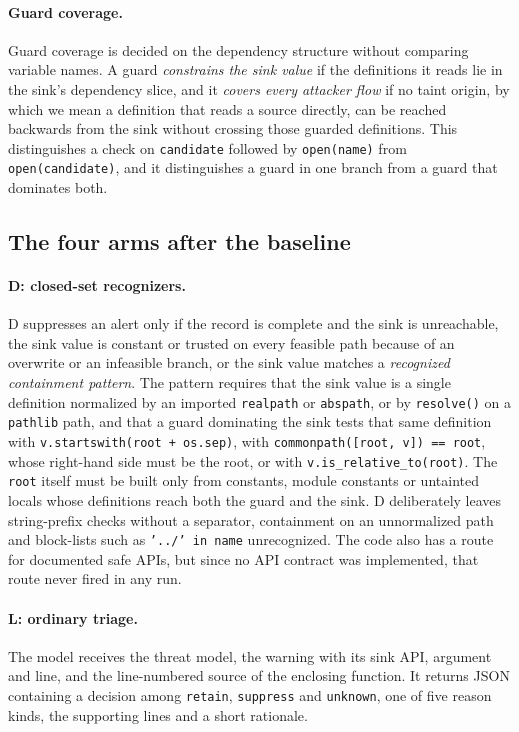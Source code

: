 \paragraph{Guard coverage.}
Guard coverage is decided on the dependency structure without comparing variable names. A guard \emph{constrains the sink value} if the definitions it reads lie in the sink's dependency slice, and it \emph{covers every attacker flow} if no taint origin, by which we mean a definition that reads a source directly, can be reached backwards from the sink without crossing those guarded definitions. This distinguishes a check on \texttt{candidate} followed by \texttt{open(name)} from \texttt{open(candidate)}, and it distinguishes a guard in one branch from a guard that dominates both.

\subsection{The four arms after the baseline}
\paragraph{D: closed-set recognizers.}
D suppresses an alert only if the record is complete and the sink is unreachable, the sink value is constant or trusted on every feasible path because of an overwrite or an infeasible branch, or the sink value matches a \emph{recognized containment pattern}. The pattern requires that the sink value is a single definition normalized by an imported \texttt{realpath} or \texttt{abspath}, or by \texttt{resolve()} on a \texttt{pathlib} path, and that a guard dominating the sink tests that same definition with \texttt{v.startswith(root + os.sep)}, with \texttt{commonpath([root, v]) == root}, whose right-hand side must be the root, or with \texttt{v.is\_relative\_to(root)}. The \texttt{root} itself must be built only from constants, module constants or untainted locals whose definitions reach both the guard and the sink. D deliberately leaves string-prefix checks without a separator, containment on an unnormalized path and block-lists such as \texttt{'../' in name} unrecognized. The code also has a route for documented safe APIs, but since no API contract was implemented, that route never fired in any run.

\paragraph{L: ordinary triage.}
The model receives the threat model, the warning with its sink API, argument and line, and the line-numbered source of the enclosing function. It returns JSON containing a decision among \texttt{retain}, \texttt{suppress} and \texttt{unknown}, one of five reason kinds, the supporting lines and a short rationale.

